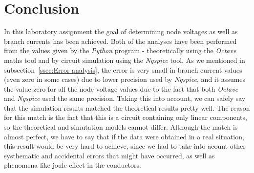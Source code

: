 \section{Conclusion}
\label{sec:conclusion}

\par \noindent In this laboratory assignment the goal of determining node voltages as well as branch currents has been achieved. Both of the analyses have been performed from the values given by the \emph{Python} program - theoretically using the \emph{Octave} maths tool and by circuit simulation using the \emph{Ngspice} tool. As we mentioned in subsection~\ref{ssec:Error analysis}, the error is very small in branch current values (even zero in some cases) due to lower precision used by \emph{Ngspice}, and it assumes the value zero for all the node voltage values due to the fact that both \emph{Octave} and \emph{Ngspice} used the same precision. Taking this into account, we can safely say that the simulation results matched the theoretical results pretty well. The reason for this match is the fact that this is a circuit containing only linear components, so the theoretical and simutation models cannot differ. Although the match is almost perfect, we have to say that if the data were obtained in a real situation, this result would be very hard to achieve, since we had to take into acount other systhematic and accidental errors that might have occurred, as well as phenomena like joule effect in the conductors.  

